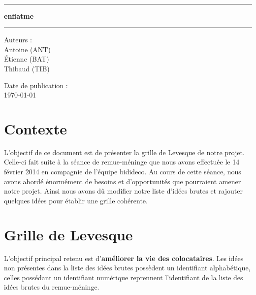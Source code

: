 \documentclass[a4paper, 12pt, french]{article}
\newcommand{\nomProjet}{enflatme\xspace}
\begin{document}
	\begin{titlepage}
		\begin{center}
			\LARGE{} \\
		    \rule{\linewidth}{1.5pt}
		    \huge{\textbf{\nomProjet}}
		    \rule{\linewidth}{1.5pt} \newline{} \newline{}
		\end{center}
		\begin{center}
		    \large{Auteurs :}\\ Antoine  (ANT)\\ Étienne  (BAT) \\ Thibaud  (TIB)
		\end{center}
		\vspace{50px}
		\begin{center}
			\large{Date de publication :}\\ \today
		\end{center}
	\end{titlepage}

  \section{Contexte}
  L'objectif de ce document est de présenter la grille de Levesque de notre projet. Celle-ci fait suite à la séance de remue-méninge que nous avons effectuée le 14 février 2014 en compagnie de l'équipe bidideco. Au cours de cette séance, nous avons abordé énormément de besoins et d'opportunités que pourraient amener notre projet. Ainsi nous avons dû modifier notre liste  d'idées brutes et rajouter quelques idées pour établir une grille cohérente.

	\section{Grille de Levesque}
	L'objectif principal retenu est d'\textbf{améliorer la vie des colocataires}.
  Les idées non présentes dans la liste des idées brutes possèdent un identifiant alphabétique, celles possédant un identifiant numérique reprennent l'identifiant de la liste des idées brutes du remue-méninge.
\end{document}
